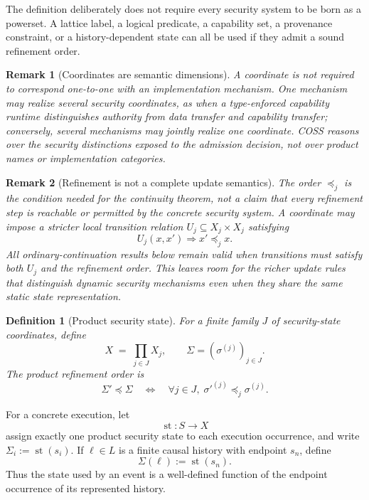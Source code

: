 \documentclass[10pt,twocolumn]{article}
\newcommand{\Model}{\textnormal{\textsc{COSS}}\xspace}
\newcommand{\state}{\Sigma}
\newcommand{\coord}{\sigma}
\newcommand{\st}{\operatorname{st}}
\newtheorem{definition}{Definition}
\newtheorem{remark}{Remark}
\begin{document}
The definition deliberately does not require every security system to be born
as a powerset.  A lattice label, a logical predicate, a capability set, a
provenance constraint, or a history-dependent state can all be used if they
admit a sound refinement order.

\begin{remark}[Coordinates are semantic dimensions]
A coordinate is not required to correspond one-to-one with an implementation
mechanism.  One mechanism may realize several security coordinates, as when a
type-enforced capability runtime distinguishes authority from data transfer and
capability transfer; conversely, several mechanisms may jointly realize one
coordinate.  \Model reasons over the security distinctions exposed to the
admission decision, not over product names or implementation categories.
\end{remark}

\begin{remark}[Refinement is not a complete update semantics]
The order $\preceq_j$ is the condition needed for the continuity theorem, not
a claim that every refinement step is reachable or permitted by the concrete
security system.  A coordinate may impose a stricter local transition relation
$U_j\subseteq X_j\times X_j$ satisfying
\begin{equation}
  U_j(x,x')\Longrightarrow x'\preceq_j x.
\end{equation}
All ordinary-continuation results below remain valid when transitions must
satisfy both $U_j$ and the refinement order.  This leaves room for the richer
update rules that distinguish dynamic security mechanisms even when they share
the same static state representation.
\end{remark}

\begin{definition}[Product security state]
For a finite family $J$ of security-state coordinates, define
\begin{equation}
  X \;=\; \prod_{j\in J} X_j,
  \qquad
  \state=(\coord^{(j)})_{j\in J}.
\end{equation}
The product refinement order is
\begin{equation}
  \state'\preceq\state
  \quad\Longleftrightarrow\quad
  \forall j\in J,\;
  \coord'^{(j)}\preceq_j\coord^{(j)}.
  \label{eq:product-order}
\end{equation}
\end{definition}

For a concrete execution, let
\begin{equation}
  \st:S\to X
\end{equation}
assign exactly one product security state to each execution occurrence, and
write $\state_i:=\st(s_i)$. If $\ell\in L$ is a finite causal history with
endpoint $s_n$, define
\begin{equation}
  \state(\ell):=\st(s_n).
  \label{eq:lineage-endpoint-state}
\end{equation}
Thus the state used by an event is a well-defined function of the endpoint
occurrence of its represented history.
\end{document}
